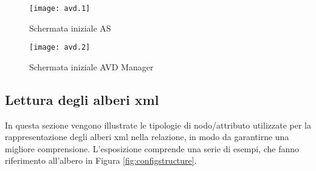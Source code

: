\begin{figure}[H]
    \centering
    \begin{minipage}{0.4\textwidth}
        \centering
        \texttt{[image: avd.1]} 
        \caption{Schermata iniziale AS}
            \label{fig:avd1}
    \end{minipage}\hfill
    \begin{minipage}{0.6\textwidth}
        \centering
        \texttt{[image: avd.2]} 
        \caption{Schermata iniziale AVD Manager}
            \label{fig:avd2}
    \end{minipage}\hfill
\end{figure}





\subsection*{Lettura degli alberi xml}

\label{sect:xmltree}
In questa sezione vengono illustrate le tipologie di nodo/attributo utilizzate per la rappresentazione degli alberi xml nella relazione, in modo da garantirne una migliore comprensione. L'esposizione comprende una serie di esempi, che fanno riferimento all'albero in Figura \ref{fig:configstructure}.

